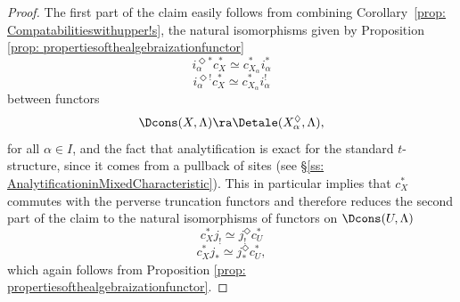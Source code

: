 \documentclass[letterpaper,11pt]{amsart}
\begin{document}
\begin{proof}
The first part of the claim easily follows from combining Corollary~\ref{prop: Compatabilitieswithupper!s}, the natural isomorphisms given by Proposition \ref{prop: propertiesofthealgebraizationfunctor}
\[ i_\alpha^{\Diamond*}c_{X}^{*} \simeq c_{X_\alpha}^{*}i_\alpha^{*} \]
\[ i_\alpha^{\Diamond!}c_{X}^{*} \simeq c_{X_\alpha}^{*}i_\alpha^{!} \]
between functors 
\[ \Dcons(X,\Lambda) \ra \Detale(X_\alpha^{\Diamond},\Lambda), \]
for all $\alpha\in I$, and the fact that analytification is exact for the standard $t$-structure, since it comes from a pullback of sites (see \S \ref{ss: AnalytificationinMixedCharacteristic}). This in particular implies that $c_{X}^{*}$ commutes with the perverse truncation functors and therefore reduces the second part of the claim to the natural isomorphisms of functors on $\Dcons(U,\Lambda)$
\[ c_{X}^{*}j_{!} \simeq j_{!}^{\Diamond}c_{U}^{*} \]
\[ c_{X}^{*}j_{*} \simeq j_{*}^{\Diamond}c_{U}^{*},\]
which again follows from Proposition \ref{prop: propertiesofthealgebraizationfunctor}.
\end{proof}
\end{document}
